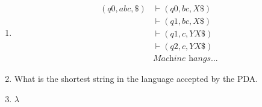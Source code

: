 \documentclass[a4paper, 12pt]{article}
\makeatletter
\renewenvironment{proof}[1][\proofname]{\par
  \normalfont \topsep6\p@\@plus6\p@\relax
  \trivlist
  \item[\hskip\labelsep
        \itshape
    #1\@addpunct{.}]\ignorespaces
}{%
  \endtrivlist\@endpefalse
}
\renewcommand{\proofname}{Solution:}
\makeatother
\begin{document}
\begin{enumerate}
\begin{enumerate}
\begin{proof}
                \begin{align*}
                    (q0, abc, \$) &\vdash (q0, bc, X\$) \\
                    &\vdash (q1, bc, X\$) \\
                    &\vdash (q1, c, YX\$) \\
                    &\vdash (q2, c, YX\$) \\
                    &\textit{Machine hangs...}
                \end{align*}
                \end{proof}
            \item What is the shortest string in the language accepted by the PDA.
                \begin{proof}
                    $\lambda$
                \end{proof}
        \end{enumerate}
    \end{enumerate}

    \newpage
\end{document}
